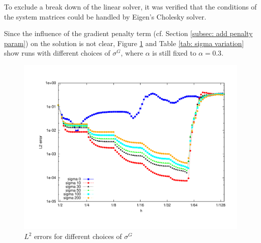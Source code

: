  To exclude a break down of the linear solver, it was verified that the conditions of the system matrices could be handled by Eigen's Cholesky solver.

Since the influence of the gradient penalty term (cf. Section \ref{subsec: add penalty param}) on the solution is not clear, Figure \ref{fig: sigma variation} and Table \ref{tab: sigma variation} show runs with different choices of $\sigma^G$, where $\alpha$ is still fixed to $\alpha=0.3$.
\begin{figure}[H]
	\centering
	\includegraphics[scale =0.4]{plots/MA1_deg2_sigma.pdf}
	\caption{$L^2$ errors for different choices of $\sigma^G$}
	\label{fig: sigma variation}
\end{figure}


